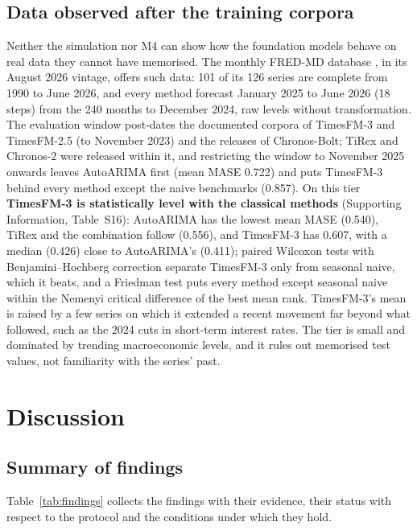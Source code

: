 \documentclass[ASNA]{USG}
\providecommand{\tableref}[1]{Table~\ref{#1}}
\begin{document}


\subsection{Data observed after the training corpora}
\label{sec:postcutoff}

Neither the simulation nor M4 can show how the foundation models behave on real data they cannot have
memorised. The monthly FRED-MD database \citep{mccracken2016fredmd}, in its August 2026 vintage, offers such
data: 101 of its 126 series are complete from 1990 to June 2026, and every method forecast January 2025 to
June 2026 (18 steps) from the 240 months to December 2024, raw levels without transformation. The evaluation
window post-dates the documented corpora of TimesFM-3 and TimesFM-2.5 (to November 2023) and the releases of
Chronos-Bolt; TiRex and Chronos-2 were released within it, and restricting the window to November 2025
onwards leaves AutoARIMA first (mean MASE 0.722) and puts TimesFM-3 behind every method except the naive
benchmarks (0.857). On this tier \textbf{TimesFM-3 is statistically level with the classical methods}
(Supporting Information, Table~S16): AutoARIMA has the lowest mean MASE (0.540), TiRex and the combination
follow (0.556), and TimesFM-3 has 0.607, with a median (0.426) close to AutoARIMA's (0.411); paired Wilcoxon
tests with Benjamini--Hochberg correction separate TimesFM-3 only from seasonal naive, which it beats, and a
Friedman test puts every method except seasonal naive within the Nemenyi critical difference of the best
mean rank.
TimesFM-3's mean is raised by a few series on which it extended a recent movement far beyond what followed,
such as the 2024 cuts in short-term interest rates. The tier is small and dominated by trending
macroeconomic levels, and it rules out memorised test values, not familiarity with the series' past.

\section{Discussion}
\label{sec:discussion}

\subsection{Summary of findings}
\label{sec:findings}

\tableref{tab:findings} collects the findings with their evidence, their status with respect to the protocol
and the conditions under which they hold.
\end{document}
